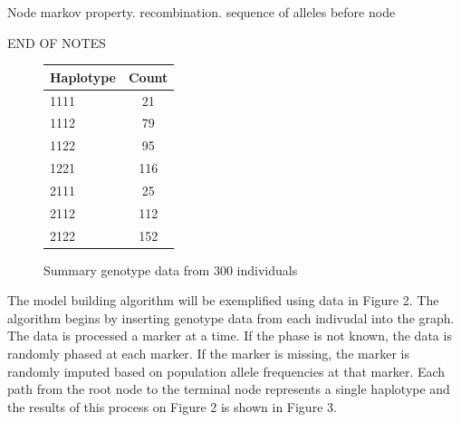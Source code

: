 \documentclass[a4paper,12pt,twoside,abstraction,titlepage]{article}
\begin{document}
Node markov property. recombination. sequence of alleles before node 


END OF NOTES

\begin{figure}[htp]
\centering
\begin{tabular}{lc}
\toprule
Haplotype & Count \\
\midrule
1111 & 21\\ 
1112 &  79\\
1122 & 95\\
1221 & 116 \\
2111 & 25\\
2112 & 112\\
2122 & 152\\
\bottomrule 
\end{tabular}
\vspace{5pt}
\caption{Summary genotype data from 300 individuals}

\vspace{-5pt}
\end{figure}


The model building algorithm will be exemplified using data in Figure 2.   The algorithm begins by inserting genotype data from each indivudal into the graph.  The data is processed a marker at a time.  If the phase is not known, the data is randomly phased at each marker.  If the marker is missing, the marker is randomly imputed based on population allele frequencies at that marker.  Each path from the root node to the terminal node represents a single haplotype and the results of this process on Figure 2 is shown in Figure 3.
\end{document}
